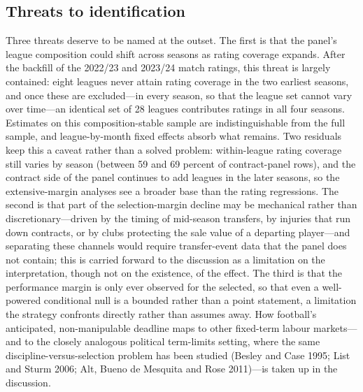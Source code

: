 \documentclass{article}
\begin{document}
\subsection{Threats to identification}
\label{sec:strategy-threats}

Three threats deserve to be named at the outset. The first is that the panel's
league composition could shift across seasons as rating coverage expands. After the
backfill of the 2022/23 and 2023/24 match ratings, this threat is largely contained:
eight leagues never attain rating coverage in the two earliest seasons, and once
these are excluded---in every season, so that the league set cannot vary over
time---an identical set of 28 leagues contributes ratings in all four seasons.
Estimates on this composition-stable sample are indistinguishable from the full
sample, and league-by-month fixed effects absorb what remains. Two residuals keep
this a caveat rather than a solved problem: within-league rating coverage still
varies by season (between 59 and 69 percent of contract-panel rows), and the
contract side of the panel continues to add leagues in the later seasons, so the
extensive-margin analyses see a broader base than the rating regressions. The second is that part
of the selection-margin decline may be mechanical rather than discretionary---driven
by the timing of mid-season transfers, by injuries that run down contracts, or by
clubs protecting the sale value of a departing player---and separating these channels
would require transfer-event data that the panel does not contain; this is carried
forward to the discussion as a limitation on the interpretation, though not on the  
existence, of the effect. The third is that the performance margin is only ever
observed for the selected, so that even a well-powered conditional null is a bounded
rather than a point statement, a limitation the strategy confronts directly rather
than assumes away. How football's anticipated, non-manipulable deadline maps to
other fixed-term labour markets---and to the closely analogous political
term-limits setting, where the same discipline-versus-selection problem has been
studied (Besley and Case 1995; List and Sturm 2006; Alt, Bueno de Mesquita and Rose
2011)---is taken up in the discussion.



\end{document}
